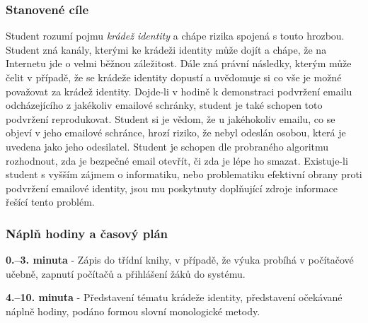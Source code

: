\documentclass[a4paper, 12pt]{article}
\begin{document}
\subsubsection{Stanovené cíle}
Student rozumí pojmu \textit{krádež identity} a chápe rizika spojená s touto hrozbou. Student zná kanály, kterými ke krádeži identity může dojít a chápe, že na Internetu jde o velmi běžnou záležitost. Dále zná právní následky, kterým může čelit v případě, že se krádeže identity dopustí a uvědomuje si co vše je možné považovat za krádež identity. Dojde-li v hodině k demonstraci podvržení emailu odcházejícího z jakékoliv emailové schránky, student je také schopen toto podvržení reprodukovat. Student si je vědom, že u jakéhokoliv emailu, co se objeví v jeho emailové schránce, hrozí riziko, že nebyl odeslán osobou, která je uvedena jako jeho odesilatel. Student je schopen dle probraného algoritmu rozhodnout, zda je bezpečné email otevřít, či zda je lépe ho smazat. Existuje-li student s vyšším zájmem o informatiku, nebo problematiku efektivní obrany proti podvržení emailové identity, jsou mu poskytnuty doplňující zdroje informace řešící tento problém.

\subsubsection{Náplň hodiny a časový plán}
\indent\textbf{0.--3. minuta} - Zápis do třídní knihy, v případě, že výuka probíhá v počítačové učebně, zapnutí počítačů a přihlášení žáků do systému.

\textbf{4.--10. minuta} - Představení tématu krádeže identity, představení očekávané náplně hodiny, podáno formou slovní monologické metody.
\end{document}

